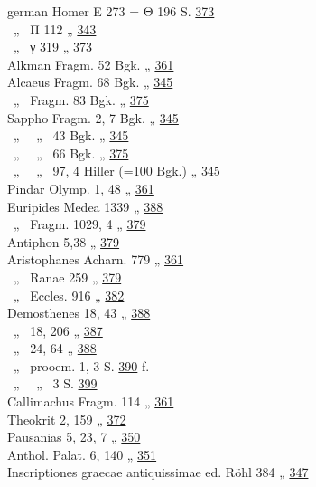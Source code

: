 \begin{otherlanguage*}{german}
Homer Ε 273 = Θ 196 \dotfill S. \hyperlink{p373}{373}\\
\phantom{a}~„~ Π 112 \dotfill „ \hyperlink{p343}{343}\\
\phantom{a}~„~ γ 319 \dotfill „ \hyperlink{p373}{373}\\
Alkman Fragm. 52 Bgk. \dotfill „ \hyperlink{p361}{361}\\
Alcaeus Fragm. 68 Bgk. \dotfill „ \hyperlink{p345}{345}\\
\phantom{a}~„~ Fragm. 83 Bgk. \dotfill „ \hyperlink{p375}{375}\\
Sappho Fragm. 2, 7 Bgk. \dotfill „ \hyperlink{p345}{345}\\
\phantom{a}~„~ ~„~ 43 Bgk. \dotfill „ \hyperlink{p345}{345}\\
\phantom{a}~„~ ~„~ 66 Bgk. \dotfill „ \hyperlink{p375}{375}\\
\phantom{a}~„~ ~„~ 97, 4 Hiller (=100 Bgk.) \dotfill „ \hyperlink{p345}{345}\\
Pindar Olymp. 1, 48 \dotfill „ \hyperlink{p361}{361}\\
Euripides Medea 1339 \dotfill „ \hyperlink{p388}{388}\\
\phantom{a}~„~ Fragm. 1029, 4 \dotfill „ \hyperlink{p379}{379}\\
Antiphon 5,38 \dotfill „ \hyperlink{p379}{379}\\
Aristophanes Acharn. 779 \dotfill „ \hyperlink{p361}{361}\\
\phantom{a}~„~ Ranae 259 \dotfill „ \hyperlink{p379}{379}\\
\phantom{a}~„~ Eccles. 916 \dotfill „ \hyperlink{p382}{382}\\
Demosthenes 18, 43 \dotfill „ \hyperlink{p388}{388}\\
\phantom{a}~„~ 18, 206 \dotfill „ \hyperlink{p387}{387}\\
\phantom{a}~„~ 24, 64 \dotfill „ \hyperlink{p388}{388}\\
\phantom{a}~„~ prooem. 1, 3 \dotfill S. \hyperlink{p390}{390} f.\\
\phantom{a}~„~ ~„~ 3 \dotfill S. \hyperlink{p399}{399}\\
Callimachus Fragm. 114 \dotfill „ \hyperlink{p361}{361}\\
Theokrit 2, 159 \dotfill „ \hyperlink{p372}{372}\\
Pausanias 5, 23, 7 \dotfill „ \hyperlink{p350}{350}\\
Anthol. Palat. 6, 140 \dotfill „ \hyperlink{p351}{351}\\
Inscriptiones graecae antiquissimae ed. Röhl 384 \dotfill „ \hyperlink{p347}{347}\\

\end{otherlanguage*}
